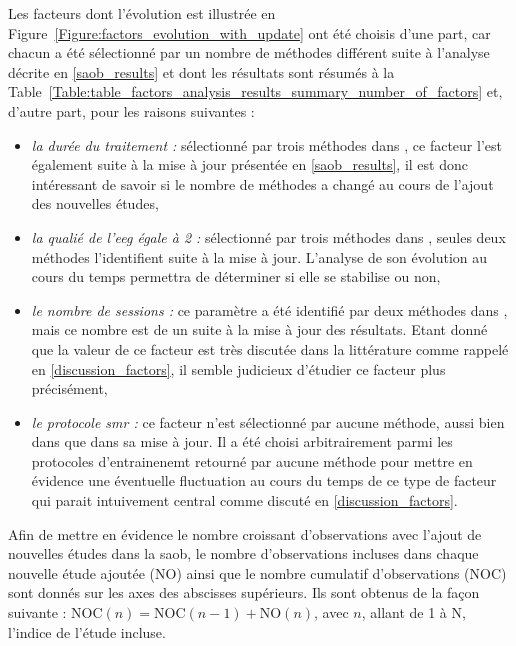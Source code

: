 Les facteurs dont l'évolution est illustrée en 
Figure~\ref{Figure:factors_evolution_with_update} ont été choisis d'une part, car chacun a été sélectionné par un nombre de méthodes différent suite à l'analyse décrite en \ref{saob_results}
et dont les résultats sont résumés à la Table~\ref{Table:table_factors_analysis_results_summary_number_of_factors} et, d'autre part, pour les raisons suivantes :
\begin{itemize}
\item \textsl{la durée du traitement :} sélectionné par trois méthodes dans \citet{Bussalb2019clinical}, ce facteur l'est également suite à la mise à jour présentée en \ref{saob_results},
il est donc intéressant de savoir si le nombre de méthodes a changé au cours de l'ajout des nouvelles études,
\item \textsl{la qualié de l'\gls{eeg} égale à 2 :} sélectionné par trois méthodes dans \citet{Bussalb2019clinical}, seules deux méthodes l'identifient suite à la mise à jour.
L'analyse de son évolution au cours du temps permettra de déterminer si elle se stabilise ou non,
\item \textsl{le nombre de sessions :} ce paramètre a été identifié par deux méthodes dans \citet{Bussalb2019clinical}, mais ce nombre est de un suite à la mise à jour des résultats.
Etant donné que la valeur de ce facteur est très discutée dans la littérature comme rappelé en \ref{discussion_factors}, il semble judicieux d'étudier ce facteur plus précisément,
\item \textsl{le protocole \gls{smr} :} ce facteur n'est sélectionné par aucune méthode, aussi bien dans \citet{Bussalb2019clinical} que dans sa mise à jour. Il a été choisi arbitrairement
parmi les protocoles d'entrainenemt retourné par aucune méthode pour mettre en évidence une éventuelle fluctuation au cours du temps de ce type de facteur qui parait intuivement central comme
discuté en \ref{discussion_factors}.
\end{itemize}

Afin de mettre en évidence le nombre croissant d'observations avec l'ajout de nouvelles études dans la \gls{saob}, le nombre d'observations 
incluses dans chaque nouvelle étude ajoutée (NO) ainsi que le nombre cumulatif d'observations (NOC) sont donnés sur les axes des abscisses supérieurs.
Ils sont obtenus de la façon suivante : $\text{NOC}(n) = \text{NOC}(n - 1) + \text{NO}(n)$, avec $n$, allant de 1 à N, l'indice de l'étude incluse.

